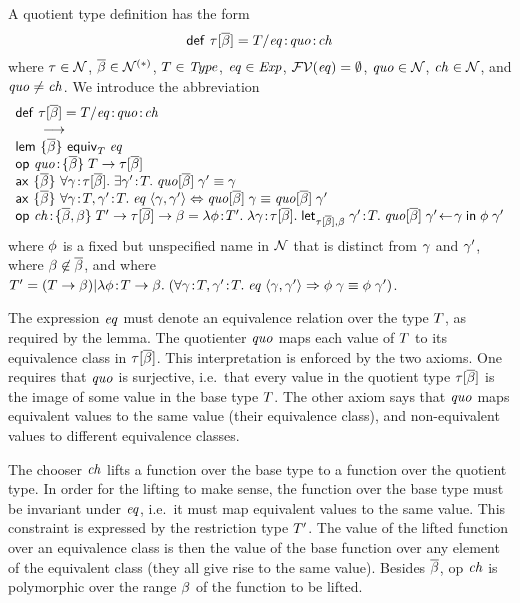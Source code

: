 A quotient type definition has the form
\[
\mathsf{def}\ \tau[\overline{\beta}]=T/\mathit{eq}\!:\!\mathit{quo}\!:\!\mathit{ch}
\]
where $\tau\in\mathcal{N}$, $\overline{\beta}\in\mathcal{N}^{(\ast)}$, $T\in\mathit{Type}$,
$\mathit{eq}\in\mathit{Exp}$, $\mathcal{FV}(\mathit{eq})=\emptyset$, $\mathit{quo}\in\mathcal{N}$,
$\mathit{ch}\in\mathcal{N}$, and $\mathit{quo}\neq\mathit{ch}$. We introduce the abbreviation
\[
\abbvert
 {\tdefquot{\tnam}{\tvarS}{\tquotO}}
 {\lem{\tvarS}{\app{\equival{\typ}}{\tqpred}}
  \\
  \odec{\quot}{\tvarS}{\tarr{\typ}{\tinst{\tnam}{\tvarS}}}
  \\
  \ax{\tvarS}{\fa{\varfx}{\tinst{\tnam}{\tvarS}}
                 {\ex{\varfx'}{\typ}
                     {\eq{\app{\op{\quot}{\tvarS}}{\varfx'}}{\varfx}}}}
  \\
  \ax{\tvarS}{\faS{\seqII{\bnd{\varfx}{\typ}}{\bnd{\varfx'}{\typ}}}
                  {\iiff{\app{\tqpred}{\tupleII{\varfx}{\varfx'}}}
                        {\eq{\app{\op{\quot}{\tvarS}}{\varfx}}
                            {\app{\op{\quot}{\tvarS}}{\varfx'}}}}}
  \\
  \odefI{\choo}{\snoc{\tvarS}{\tvar}}
        {\tarr{\typ'}{\tarr{\tinst{\tnam}{\tvarS}}{\tvar}}}
        {\abs{\varfxfun}{\typ'}
             {\abs{\varfx}{\tinst{\tnam}{\tvarS}}
                  {\lett{\tinst{\tnam}{\tvarS}}{\tvar}
                        {\varfx'}{\typ}
                        {\app{\op{\quot}{\tvarS}}{\varfx'}}
                        {\varfx}
                        {\app{\varfxfun}{\varfx'}}}}}}
\]
where $\phi$ is a fixed but unspecified name in $\mathcal{N}$ that is distinct
from $\gamma$ and $\gamma'$, where $\beta\not\in\overline{\beta}$, and where
$T'=(T\to\beta)|\lambda\phi\!:\!T\to\beta.\;(\forall\gamma\!:\!T,\gamma'\!:\!T.\;\mathit{eq}\;\langle\gamma,\gamma'\rangle\Rightarrow\phi\;\gamma\equiv\phi\;\gamma')$.

The expression $\mathit{eq}$ must denote an equivalence relation over the type
$T$, as required by the lemma. The quotienter $\mathit{quo}$ maps each value of
$T$ to its equivalence class in $\tau[\overline{\beta}]$. This
interpretation is enforced by the two axioms. One requires that $\mathit{quo}$ is
surjective, i.e.\ that every value in the quotient type
$\tau[\overline{\beta}]$ is the image of some value in the base type
$T$. The other axiom says that $\mathit{quo}$ maps equivalent values to the same
value (their equivalence class), and non-equivalent values to different
equivalence classes.

The chooser $\mathit{ch}$ lifts a function over the base type to a function over the
quotient type. In order for the lifting to make sense, the function over the
base type must be invariant under $\mathit{eq}$, i.e.\ it must map equivalent
values to the same value. This constraint is expressed by the restriction type
$T'$. The value of the lifted function over an equivalence class is then
the value of the base function over any element of the equivalent class (they
all give rise to the same value). Besides $\overline{\beta}$, op $\mathit{ch}$ is polymorphic
over the range $\beta$ of the function to be lifted.
